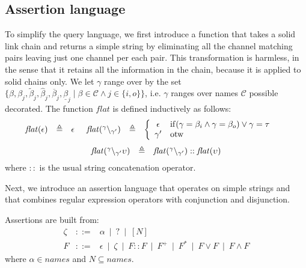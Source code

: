 \subsection{Assertion language}

To simplify the query language, we first introduce a function that takes a solid link chain and returns a simple string by eliminating all the channel matching pairs leaving just one channel per each pair. This transformation is harmless, in the sense that it retains all the information in the chain, because it is applied to solid chains only. We let $\gamma$ range over by the set $\{\beta,\beta_j,\tilde{\beta}_j,\hat{\beta}_j,\overline{\beta}_j, \underline{\beta}_j \mid \beta \in \mathcal{C}\wedge j \in \{i,o\}\}$, i.e. $\gamma$ ranges over names $\mathcal{C}$ possible decorated.
The function $\mathit{flat}$ is defined inductively as follows:
\[
\begin{array}{lcl@{\hspace{0.5cm}}lcl@{\hspace{0.5cm}}lcl@{\hspace{0.5cm}}lcl}
\mathit{flat}(\epsilon)&\defeq & \epsilon &
\mathit{flat}(\link{\gamma}{\gamma'}) &  \defeq & \left \{ \begin{array}{cl} \epsilon & \mathrm{if } (\gamma = \beta_i \wedge \gamma = \beta_o)  \vee \gamma = \silent\\
\gamma' & \mathrm{otw }  \end{array} \right. &
\end{array}\]
\[
\begin{array}{lcl}
\mathit{flat}({}^{\gamma} \backslash_{\gamma'}\upsilon)& \triangleq & \mathit{flat}({}^{\gamma} \backslash_{\gamma'}):: \mathit{flat}(\upsilon)\\
\end{array}\\
\]
where  $::$ is the usual string concatenation operator.


Next, we introduce an assertion language that operates on simple strings
and that combines regular expression operators with conjunction and disjunction.


\begin{definition}
\label{def:assetionl}
Assertions are built from: 
$$
\begin{array}{lcl}
\zeta & ::= & 
\alpha ~\mid ~ 
? ~\mid ~ 
[N]
\\
F & ::= & 
\epsilon ~\mid ~ 
\zeta ~\mid ~ 
F::F ~\mid ~ 
F^+ ~\mid ~ 
F^* ~\mid ~ 
F \vee F ~\mid ~ 
F \wedge F
\end{array}
$$
where $\alpha \in \mathit{names}$ and $N\subseteq \mathit{names}$.
\end{definition}

